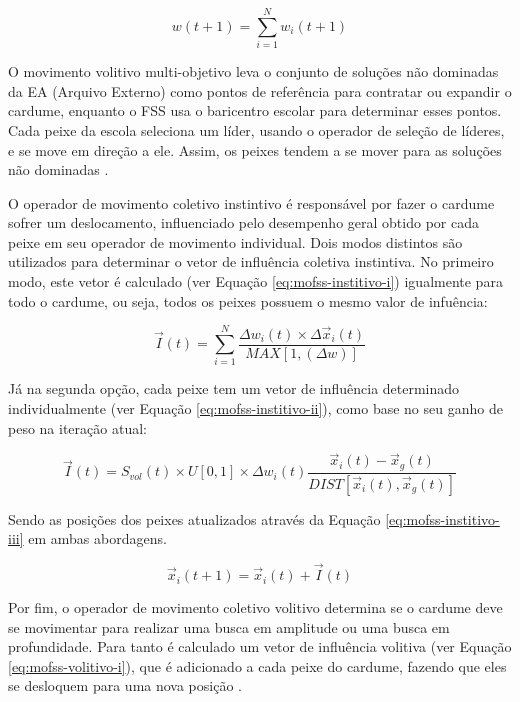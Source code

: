 \begin{equation} \label{eq:mofss-pesocardume}
    w(t + 1) = \sum_{i=1}^{N} w_{i}(t+1)
\end{equation}

O movimento volitivo multi-objetivo leva o conjunto de soluções não dominadas da EA (Arquivo Externo) como pontos de referência para contratar ou expandir o cardume, enquanto o FSS usa o baricentro escolar para determinar esses pontos. Cada peixe da escola seleciona um líder, usando o operador de seleção de líderes, e se move em direção a ele. Assim, os peixes tendem a se mover para as soluções não dominadas \cite{bastos2015multi}.

O operador de movimento coletivo instintivo é responsável por fazer o cardume sofrer um deslocamento, influenciado pelo desempenho geral obtido por cada peixe em seu operador de movimento individual. Dois modos distintos são utilizados para determinar o vetor de influência coletiva instintiva. No primeiro modo, este vetor é calculado (ver Equação \ref{eq:mofss-institivo-i}) igualmente para todo o cardume, ou seja, todos os peixes possuem o mesmo valor de infuência:

\begin{equation} \label{eq:mofss-institivo-i}
    \vec{I}(t) = \sum_{i=1}^{N} \frac{\Delta w_{i}(t) \times \Delta \vec{x}_{i}(t)}{MAX[1, (\Delta w)]}
\end{equation}

Já na segunda opção, cada peixe tem um vetor de influência determinado individualmente (ver Equação \ref{eq:mofss-institivo-ii}), como base no seu ganho de peso na iteração atual:

\begin{equation} \label{eq:mofss-institivo-ii}
    \vec{I}(t) = S_{vol}(t) \times U[0,1] \times \Delta w_{i}(t) \frac{\vec{x}_{i}(t) - \vec{x}_{g}(t)}{DIST[\vec{x}_{i}(t), \vec{x}_{g}(t)]}
\end{equation}

Sendo as posições dos peixes atualizados através da Equação \ref{eq:mofss-institivo-iii} em ambas abordagens.

\begin{equation} \label{eq:mofss-institivo-iii}
    \vec{x}_{i}(t + 1) = \vec{x}_{i}(t) + \vec{I}(t)
\end{equation}

Por fim, o operador de movimento coletivo volitivo determina se o cardume deve se movimentar para realizar uma busca em amplitude ou uma busca em profundidade. Para tanto é calculado um vetor de influência volitiva (ver Equação \ref{eq:mofss-volitivo-i}), que é adicionado a cada peixe do cardume, fazendo que eles se desloquem para uma nova posição \cite{bastos2015multi}.

